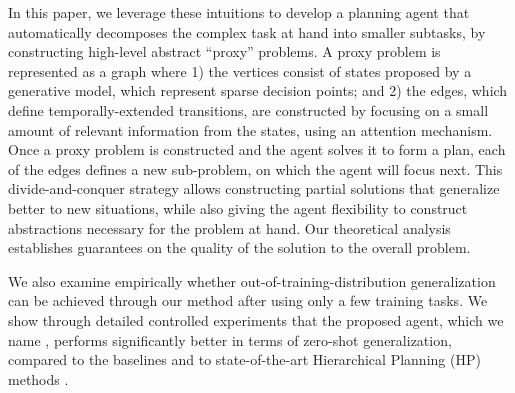In this paper, we leverage these intuitions to develop a planning agent that automatically decomposes the complex task at hand into smaller subtasks, by constructing high-level abstract ``proxy'' problems. A proxy problem is represented as a graph where 1) the vertices consist of states proposed by a generative model, which represent sparse decision points; and 2) the edges, which define temporally-extended transitions, are constructed by focusing on a small amount of relevant information from the states, using an attention mechanism. Once a proxy problem is constructed and the agent solves it to form a plan, each of the edges defines a new sub-problem, on which the agent will focus next. This divide-and-conquer strategy allows constructing partial solutions that generalize better to new situations, while also giving the agent flexibility to construct abstractions necessary for the problem at hand. Our theoretical analysis establishes guarantees on the quality of the solution to the overall problem.

We also examine empirically whether out-of-training-distribution generalization can be achieved through our method after using only a few training tasks. %
We show through detailed controlled experiments that the proposed agent, which we name \agentshort{}, performs significantly better in terms of zero-shot generalization, compared to the baselines and to state-of-the-art Hierarchical Planning (HP) methods \citep{nasiriany2019planning,hafner2022deep}. %

